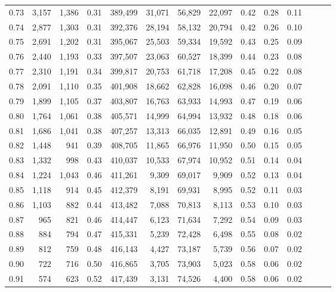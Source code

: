 \begin{tabular}{rrrrrrrrrrrrrr}
0.73 &  3,157 &  1,386 &  0.31 &  389,499 &   31,071 &  56,829 &  22,097 &  0.42 &  0.28 &      0.11 \\
0.74 &  2,877 &  1,303 &  0.31 &  392,376 &   28,194 &  58,132 &  20,794 &  0.42 &  0.26 &      0.10 \\
0.75 &  2,691 &  1,202 &  0.31 &  395,067 &   25,503 &  59,334 &  19,592 &  0.43 &  0.25 &      0.09 \\
0.76 &  2,440 &  1,193 &  0.33 &  397,507 &   23,063 &  60,527 &  18,399 &  0.44 &  0.23 &      0.08 \\
0.77 &  2,310 &  1,191 &  0.34 &  399,817 &   20,753 &  61,718 &  17,208 &  0.45 &  0.22 &      0.08 \\
0.78 &  2,091 &  1,110 &  0.35 &  401,908 &   18,662 &  62,828 &  16,098 &  0.46 &  0.20 &      0.07 \\
0.79 &  1,899 &  1,105 &  0.37 &  403,807 &   16,763 &  63,933 &  14,993 &  0.47 &  0.19 &      0.06 \\
0.80 &  1,764 &  1,061 &  0.38 &  405,571 &   14,999 &  64,994 &  13,932 &  0.48 &  0.18 &      0.06 \\
0.81 &  1,686 &  1,041 &  0.38 &  407,257 &   13,313 &  66,035 &  12,891 &  0.49 &  0.16 &      0.05 \\
0.82 &  1,448 &    941 &  0.39 &  408,705 &   11,865 &  66,976 &  11,950 &  0.50 &  0.15 &      0.05 \\
0.83 &  1,332 &    998 &  0.43 &  410,037 &   10,533 &  67,974 &  10,952 &  0.51 &  0.14 &      0.04 \\
0.84 &  1,224 &  1,043 &  0.46 &  411,261 &    9,309 &  69,017 &   9,909 &  0.52 &  0.13 &      0.04 \\
0.85 &  1,118 &    914 &  0.45 &  412,379 &    8,191 &  69,931 &   8,995 &  0.52 &  0.11 &      0.03 \\
0.86 &  1,103 &    882 &  0.44 &  413,482 &    7,088 &  70,813 &   8,113 &  0.53 &  0.10 &      0.03 \\
0.87 &    965 &    821 &  0.46 &  414,447 &    6,123 &  71,634 &   7,292 &  0.54 &  0.09 &      0.03 \\
0.88 &    884 &    794 &  0.47 &  415,331 &    5,239 &  72,428 &   6,498 &  0.55 &  0.08 &      0.02 \\
0.89 &    812 &    759 &  0.48 &  416,143 &    4,427 &  73,187 &   5,739 &  0.56 &  0.07 &      0.02 \\
0.90 &    722 &    716 &  0.50 &  416,865 &    3,705 &  73,903 &   5,023 &  0.58 &  0.06 &      0.02 \\
0.91 &    574 &    623 &  0.52 &  417,439 &    3,131 &  74,526 &   4,400 &  0.58 &  0.06 &      0.02 \\

\end{tabular}
